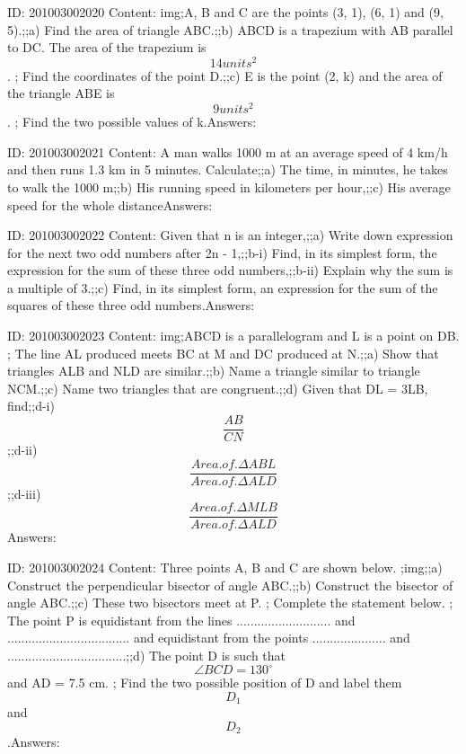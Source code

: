 \documentclass{article}
\begin{document}
ID: 201003002020
Content:
img;A, B and C are the points (3, 1), (6, 1) and (9, 5).;;a) Find the area of triangle ABC.;;b) ABCD is a trapezium with AB parallel to DC. The area of the trapezium is $$14 units^2$$. ; Find the coordinates of the point D.;;c) E is the point (2, k) and the area of the triangle ABE is $$9 units^2$$. ; Find the two possible values of k.Answers:

ID: 201003002021
Content:
A man walks 1000 m at an average speed of 4 km/h and then runs 1.3 km in 5 minutes. Calculate;;a) The time, in minutes, he takes to walk the 1000 m;;b) His running speed in kilometers per hour,;;c) His average speed for the whole distanceAnswers:

ID: 201003002022
Content:
Given that n is an integer,;;a) Write down expression for the next two odd numbers after 2n - 1,;;b-i) Find, in its simplest form, the expression for the sum of these three odd numbers,;;b-ii) Explain why the sum is a multiple of 3.;;c) Find, in its simplest form, an expression for the sum of the squares of these three odd numbers.Answers:

ID: 201003002023
Content:
img;ABCD is a parallelogram and L is a point on DB. ; The line AL produced meets BC at M and DC produced at N.;;a) Show that triangles ALB and NLD are similar.;;b) Name a triangle similar to triangle NCM.;;c) Name two triangles that are congruent.;;d) Given that DL = 3LB, find;;d-i) $$\frac{AB}{CN}$$;;d-ii) $$\frac{Area.of.\Delta ABL}{Area.of.\Delta ALD}$$ ;;d-iii) $$\frac{Area.of.\Delta MLB}{Area.of.\Delta ALD}$$ Answers:

ID: 201003002024
Content:
Three points A, B and C are shown below. ;img;;a) Construct the perpendicular bisector of angle ABC.;;b) Construct the bisector of angle ABC.;;c) These two bisectors meet at P. ; Complete the statement below. ; The point P is equidistant from the lines ........................... and  ................................... and equidistant from the points ..................... and ..................................;;d) The point D is such that $$\angle BCD = 130^{\circ}$$ and AD = 7.5 cm. ; Find the two possible position of D and label them $$D_1$$ and $$D_2$$.Answers:
\end{document}

